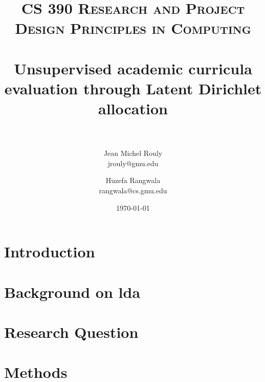 \documentclass[paper=a4, fontsize=11pt]{scrartcl} %
\title{\normalfont\normalsize
\textsc{CS 390 Research and Project Design Principles in Computing} \\ [25pt] %
\horrule{0.5pt} \\[0.4cm] %
\huge Unsupervised academic curricula evaluation through Latent Dirichlet
allocation \\ %
\horrule{2pt} \\[0.5cm] %
}
\author{Jean Michel Rouly \\ jrouly@gmu.edu \and Huzefa Rangwala \\ rangwala@cs.gmu.edu} %
\date{\normalsize\today} %
\numberwithin{equation}{section} %
\numberwithin{figure}{section} %
\numberwithin{table}{section} %
\begin{document}
\maketitle %









\section{Introduction}





\section{Background on \acf{lda}}





\section{Research Question}





\section{Methods}

\end{document}
